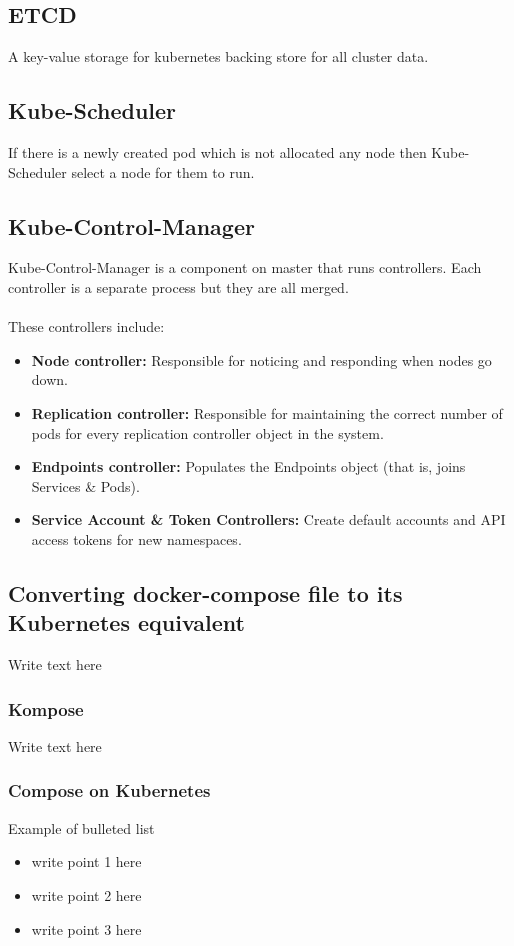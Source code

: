 \documentclass[12pt]{article}
\begin{document}
\subsection{ETCD}
A key-value storage for kubernetes backing store for all cluster data.
\subsection{Kube-Scheduler}
If there is a newly created pod which is not allocated any node then Kube-Scheduler select a node for them to run.
\subsection{Kube-Control-Manager}
Kube-Control-Manager is a component on master that runs controllers.
Each controller is a separate process but they are all merged.\\\\
These controllers include:
\begin{itemize}
	\item \textbf{Node controller:} Responsible for noticing and responding when nodes go down.
	\item \textbf{Replication controller:} Responsible for maintaining the correct number of pods for every replication controller object in the system.
	\item \textbf{Endpoints controller:} Populates the Endpoints object (that is, joins Services \& Pods).
	\item \textbf{Service Account \& Token Controllers:} Create default accounts and API access tokens for new namespaces.
\end{itemize}
\subsection{Converting docker-compose file to its Kubernetes equivalent}
Write text here
\subsubsection{Kompose}
Write text here
\subsubsection{Compose on Kubernetes}
Example of bulleted list
\begin{itemize}
 \item write point 1 here \cite{SRS1998}\cite{SimpleCCP-Windows}
 \item write point 2 here
 \item write point 3 here
\end{itemize}
\end{document}
